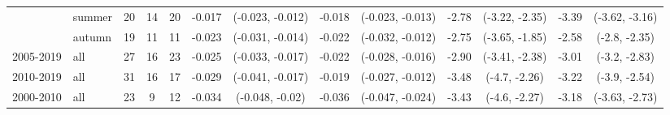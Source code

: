 \begin{table}
\begin{center}
{\begin{tabular}{ll|ccc|cccc|cccc}
          & summer &              20 &          14 &          20 &                  -0.017 &  (-0.023, -0.012) & -0.018 &  (-0.023, -0.013) &                    -2.78 &  (-3.22, -2.35) & -3.39 &  (-3.62, -3.16) \\
          & autumn &              19 &          11 &          11 &                  -0.023 &  (-0.031, -0.014) & -0.022 &  (-0.032, -0.012) &                    -2.75 &  (-3.65, -1.85) & -2.58 &   (-2.8, -2.35) \\
2005-2019 & all &              27 &          16 &          23 &                  -0.025 &  (-0.033, -0.017) & -0.022 &  (-0.028, -0.016) &                    -2.90 &  (-3.41, -2.38) & -3.01 &   (-3.2, -2.83) \\
2010-2019 & all &              31 &          16 &          17 &                  -0.029 &  (-0.041, -0.017) & -0.019 &  (-0.027, -0.012) &                    -3.48 &   (-4.7, -2.26) & -3.22 &   (-3.9, -2.54) \\
2000-2010 & all &              23 &           9 &          12 &                  -0.034 &   (-0.048, -0.02) & -0.036 &  (-0.047, -0.024) &                    -3.43 &   (-4.6, -2.27) & -3.18 &  (-3.63, -2.73) \\
\bottomrule
\end{tabular}}
\end{center}
\end{table}

